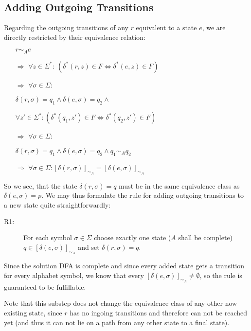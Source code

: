 \subsection{Adding Outgoing Transitions} \label{ch:4:add-out-tr}

Regarding the outgoing transitions of any $r$ equivalent to a state $e$, we are directly restricted by their equivalence relation:
\begin{itemize}
	\item[] $r \sim_A e$
	\item[$\Rightarrow$] $\forall z \in \Sigma^* \colon\ (\delta^*(r, z) \in F \Leftrightarrow \delta^*(e, z) \in F)$
	
	\item[$\Rightarrow$] $\forall \sigma \in \Sigma \colon$
	
	\qquad $\delta(r, \sigma) = q_1 \land \delta(e, \sigma) = q_2 \land$
	
	\qquad $\forall z' \in \Sigma^*\colon (\delta^*(q_1, z') \in F \Leftrightarrow \delta^*(q_2, z') \in F)$
	
	\item[$\Rightarrow$] $\forall \sigma \in \Sigma \colon$
	
	\qquad $\delta(r, \sigma) = q_1 \land \delta(e, \sigma) = q_2 \land q_1 \sim_A q_2$
	
	\item[$\Rightarrow$] $\forall \sigma \in \Sigma \colon [\delta(r, \sigma)]_{\sim_A} = [\delta(e, \sigma)]_{\sim_A}$
\end{itemize}
So we see, that the state $\delta(r, \sigma) = q$ must be in the same equivalence class as $\delta(e, \sigma) = p$. We may thus formulate the rule for adding outgoing transitions to a new state quite straightforwardly:
\begin{description}
	\item[R1:] For each symbol $\sigma \in \Sigma$ choose exactly one state ($A$ shall be complete) $q\in[\delta(e, \sigma)]_{\sim_A}$ and set $\delta(r, \sigma) = q$.
\end{description}
Since the solution DFA is complete and since every added state gets a transition for every alphabet symbol, we know that every $[\delta(e, \sigma)]_{\sim_A} \neq \emptyset$, so the rule is guaranteed to be fulfillable.

Note that this substep does not change the equivalence class of any other now existing state, since $r$ has no ingoing transitions and therefore can not be reached yet (and thus it can not lie on a path from any other state to a final state).

